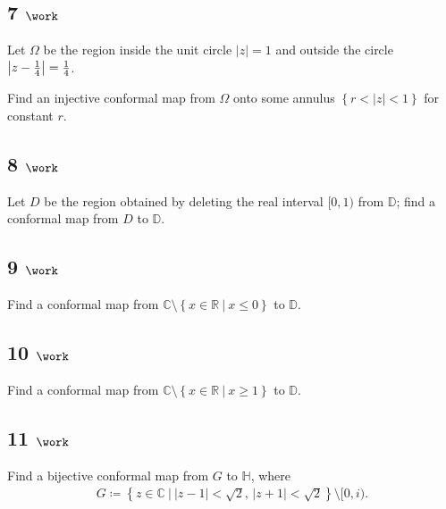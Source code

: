 \hypertarget{work-58}{%
\subsection{\texorpdfstring{7
\(\work\)}{7 \textbackslash work}}\label{work-58}}

Let \(\Omega\) be the region inside the unit circle
\({\left\lvert {z} \right\rvert} = 1\) and outside the circle
\({\left\lvert {z-{1\over 4}} \right\rvert} = {1\over 4}\).

Find an injective conformal map from \(\Omega\) onto some annulus
\(\left\{{r < {\left\lvert {z} \right\rvert} < 1}\right\}\) for constant
\(r\).

\hypertarget{work-59}{%
\subsection{\texorpdfstring{8
\(\work\)}{8 \textbackslash work}}\label{work-59}}

Let \(D\) be the region obtained by deleting the real interval
\([0, 1)\) from \({\mathbb{D}}\); find a conformal map from \(D\) to
\({\mathbb{D}}\).

\hypertarget{work-60}{%
\subsection{\texorpdfstring{9
\(\work\)}{9 \textbackslash work}}\label{work-60}}

Find a conformal map from
\({\mathbb{C}}\setminus\left\{{x\in {\mathbb{R}}{~\mathrel{\Big|}~}x\leq 0}\right\}\)
to \({\mathbb{D}}\).

\hypertarget{work-61}{%
\subsection{\texorpdfstring{10
\(\work\)}{10 \textbackslash work}}\label{work-61}}

Find a conformal map from
\({\mathbb{C}}\setminus\left\{{x\in {\mathbb{R}}{~\mathrel{\Big|}~}x\geq 1}\right\}\)
to \({\mathbb{D}}\).

\hypertarget{work-62}{%
\subsection{\texorpdfstring{11
\(\work\)}{11 \textbackslash work}}\label{work-62}}

Find a bijective conformal map from \(G\) to \({\mathbb{H}}\), where
\begin{align*}  
G \coloneqq\left\{{z\in {\mathbb{C}}{~\mathrel{\Big|}~}{\left\lvert {z-1} \right\rvert} < \sqrt 2,\, {\left\lvert {z+1} \right\rvert} < \sqrt 2}\right\} \setminus [0, i)
.\end{align*}

